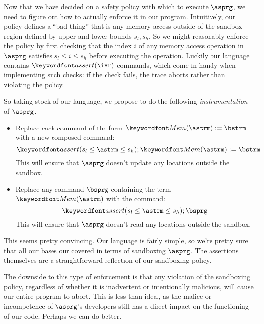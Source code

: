 \documentclass[11pt,twoside]{scrartcl}
\begin{document}
Now that we have decided on a safety policy with which to execute $\asprg$, we need to figure out how to actually enforce it in our program. Intuitively, our policy defines a ``bad thing'' that is any memory access outside of the sandbox region defined by upper and lower bounds $s_l, s_h$. So we might reasonably enforce the policy by first checking that the index $i$ of any memory access operation in $\asprg$ satisfies $s_l \le i \le s_h$ before executing the operation. Luckily our language contains $\passert{\ivr}$ commands, which come in handy when implementing such checks: if the check fails, the trace aborts rather than violating the policy.

So taking stock of our language, we propose to do the following \emph{instrumentation} of $\asprg$.
\begin{itemize}
  \item Replace each command of the form $\pderef{\astrm}:=\bstrm$ with a new composed command:
  \[
  \passert{s_l \le \astrm \le s_h}; \pderef{\astrm}:=\bstrm
  \]
  This will ensure that $\asprg$ doesn't update any locations outside the sandbox.

  \item Replace any command $\bsprg$ containing the term $\pderef{\astrm}$ with the command:
  \[
  \passert{s_l \le \astrm \le s_h}; \bsprg
  \]
  This will ensure that $\asprg$ doesn't read any locations outside the sandbox.
\end{itemize}
This seems pretty convincing. Our language is fairly simple, so we're pretty sure that all our bases our covered in terms of sandboxing $\asprg$. The assertions themselves are a straightforward reflection of our sandboxing policy.

The downside to this type of enforcement is that any violation of the sandboxing policy, regardless of whether it is inadvertent or intentionally malicious, will cause our entire program to abort. This is less than ideal, as the malice or incompetence of $\asprg$'s developers still has a direct impact on the functioning of our code. Perhaps we can do better.
\end{document}
